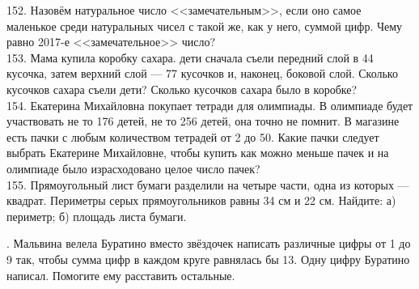 \documentclass[12pt]{article}
\begin{document}
152. Назовём натуральное число <<замечательным>>, если оно самое маленькое среди натуральных чисел с такой же, как у него, суммой цифр. Чему равно 2017-е <<замечательное>> число?\\
153. Мама купила коробку сахара. дети сначала съели передний слой в 44 кусочка, затем верхний слой --- 77 кусочков и, наконец, боковой слой. Сколько кусочков сахара съели дети? Сколько кусочков сахара было в коробке?\\
154. Екатерина Михайловна покупает тетради для олимпиады. В олимпиаде будет участвовать не то 176 детей, не то 256 детей, она точно не помнит. В магазине есть пачки с любым количеством тетрадей от 2 до 50. Какие пачки следует выбрать Екатерине Михайловне, чтобы купить как можно меньше пачек и на олимпиаде было израсходовано целое число пачек?\\
155. Прямоугольный лист бумаги разделили на четыре части, одна из которых --- квадрат. Периметры серых прямоугольников равны 34 см и 22 см. Найдите: а) периметр; б) площадь листа бумаги.
\begin{center}
\begin{figure}[ht!]
\end{figure}
\end{center}\newpage{}. Мальвина велела Буратино вместо звёздочек написать различные цифры от 1 до 9 так, чтобы сумма цифр в каждом круге равнялась бы 13. Одну цифру Буратино написал. Помогите ему расставить остальные.
\begin{center}
\begin{figure}[ht!]
\end{figure}
\end{center}
\end{document}
